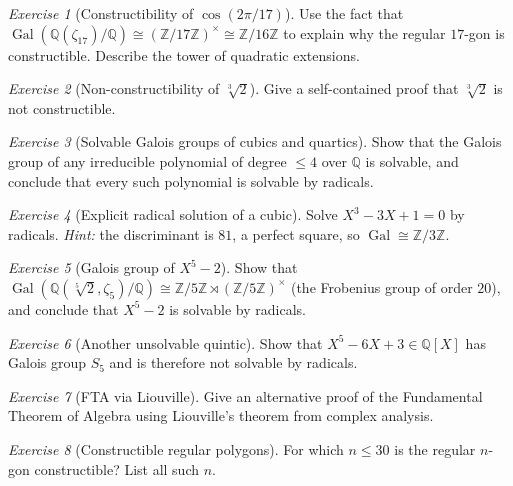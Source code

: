 \documentclass[12pt,a4paper,openany]{book}
\theoremstyle{definition}
\theoremstyle{remark}
\newtheorem{exercise}{Exercise}[chapter]
\newcommand{\Z}{\mathbb{Z}}
\newcommand{\Q}{\mathbb{Q}}
\DeclareMathOperator{\Gal}{Gal}
\begin{document}
\begin{exercise}[Constructibility of $\cos(2\pi/17)$]\label{exo:17-gon}
Use the fact that $\Gal(\Q(\zeta_{17})/\Q)\cong(\Z/17\Z)^{\times}\cong
\Z/16\Z$ to explain why the regular $17$-gon is constructible.  Describe
the tower of quadratic extensions.
\end{exercise}

\begin{exercise}[{Non-constructibility of $\sqrt[3]{2}$}]\label{exo:cube-root-2}
Give a self-contained proof that $\sqrt[3]{2}$ is not constructible.
\end{exercise}

\begin{exercise}[Solvable Galois groups of cubics and quartics]
\label{exo:solvable-low}
Show that the Galois group of any irreducible polynomial of degree $\leq 4$
over $\Q$ is solvable, and conclude that every such polynomial is solvable
by radicals.
\end{exercise}

\begin{exercise}[Explicit radical solution of a cubic]\label{exo:cubic-radical}
Solve $X^{3}-3X+1=0$ by radicals.  \textit{Hint:} the discriminant is $81$,
a perfect square, so $\Gal\cong\Z/3\Z$.
\end{exercise}

\begin{exercise}[Galois group of $X^{5}-2$]\label{exo:x5-2}
Show that $\Gal(\Q(\sqrt[5]{2},\zeta_{5})/\Q)\cong\Z/5\Z\rtimes
(\Z/5\Z)^{\times}$ (the Frobenius group of order $20$), and conclude that
$X^{5}-2$ is solvable by radicals.
\end{exercise}

\begin{exercise}[Another unsolvable quintic]\label{exo:x5-6x-3}
Show that $X^{5}-6X+3\in\Q[X]$ has Galois group $S_{5}$ and is therefore
not solvable by radicals.
\end{exercise}

\begin{exercise}[FTA via Liouville]\label{exo:fta-liouville}
Give an alternative proof of the Fundamental Theorem of Algebra using
Liouville's theorem from complex analysis.
\end{exercise}

\begin{exercise}[Constructible regular polygons]\label{exo:constructible-ngon}
For which $n\leq 30$ is the regular $n$-gon constructible?  List all such $n$.
\end{exercise}
\end{document}
